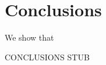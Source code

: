 \documentclass{sig-alternate}
\begin{document}

\section{Conclusions}

We show that 

CONCLUSIONS STUB






\end{document}

